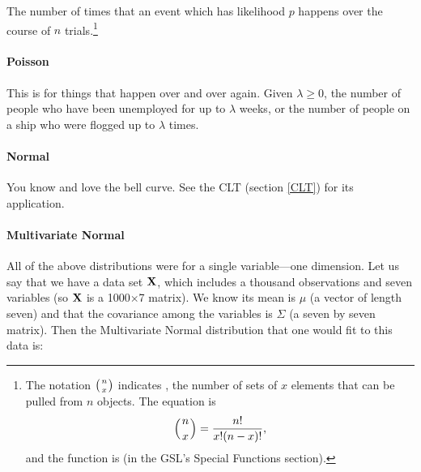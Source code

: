 The number of times that an event which has likelihood $p$ happens over the
course of $n$ trials.\footnote{The notation $\left({n\atop x}\right)$ indicates
, the number of sets of $x$ elements that can be
pulled from $n$ objects. The equation is $$\left({n\atop x}\right) =
{n!\over x!(n-x)!},$$ and the function is 
(in the GSL's Special Functions section).}


\paragraph{Poisson}

This is for things that happen over and over again. Given
$\lambda\geq0$, 
the number of people who have been unemployed for
up to $\lambda$ weeks,
or the number of people on a ship who were flogged up to
$\lambda$ times. 


\paragraph{Normal}

You know and love the bell curve. See the CLT (section \ref{CLT}) for
its application.


\paragraph{Multivariate Normal}
All of the above distributions were for a single variable---one
dimension. Let us say that we have a data set ${\bf X}$, which includes a
thousand observations and seven variables (so ${\bf X}$ is a 1000$\times$7
matrix). We know its mean is
$\mu$ (a vector of length seven) and that the covariance among the
variables is $\Sigma$ (a seven by seven matrix). Then the Multivariate
Normal distribution that one would fit to this data is:

